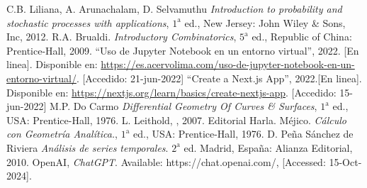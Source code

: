 \begin{thebibliography}{99}
	 C.B. Liliana, A. Arunachalam, D. Selvamuthu
	{\it Introduction to probability and stochastic processes with applications}, $1^{\text{a}}$ ed., New Jersey: John Wiley \& Sons, Inc, 2012.
	 R.A. Brualdi.
	{\it Introductory Combinatorics}, $5^{\text{a}}$ ed., Republic of China: Prentice-Hall, 2009.
	 ``Uso de Jupyter Notebook en un entorno virtual'', 2022. [En linea]. Disponible en: \url{https://es.acervolima.com/uso-de-jupyter-notebook-en-un-entorno-virtual/}. [Accedido: 21-jun-2022]
	 ``Create a Next.js App'', 2022.[En linea]. Disponible en: \url{https://nextjs.org/learn/basics/create-nextjs-app}. [Accedido: 15-jun-2022]
	 M.P. Do Carmo
	{\it Differential Geometry Of Curves \& Surfaces}, $1^{\text{a}}$ ed., USA: Prentice-Hall, 1976.
	 L. Leithold, , 2007.  Editorial Harla. M\'ejico. 
	{\it C\'alculo con Geometr\'ia Anal\'itica.}, $1^{\text{a}}$ ed., USA: Prentice-Hall, 1976.
	 D. Pe\~na S\'anchez de Riviera 
	{\it An\'alisis de series temporales}. $2^{\text{a}}$ ed. Madrid, Espa\~na:  Alianza Editorial, 2010.
	 OpenAI,
	{\it ChatGPT}. Available: https://chat.openai.com/, [Accessed: 15-Oct-2024].
\end{thebibliography} 